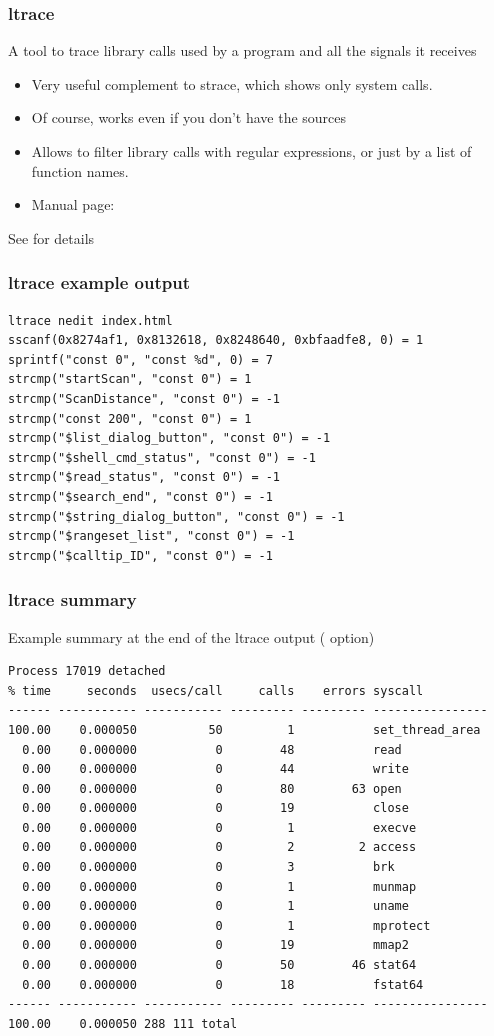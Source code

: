 \begin{frame}
  \frametitle{ltrace}
  A tool to trace library calls used by a program and all the signals
  it receives
  \begin{itemize}
  \item Very useful complement to strace, which shows only system
    calls.
  \item Of course, works even if you don't have the sources
  \item Allows to filter library calls with regular expressions, or
    just by a list of function names.
  \item Manual page: 
  \end{itemize}
  See  for details
\end{frame}

\begin{frame}[fragile]
  \frametitle{ltrace example output}
  \small
  \begin{block}{}
\begin{verbatim}
ltrace nedit index.html
sscanf(0x8274af1, 0x8132618, 0x8248640, 0xbfaadfe8, 0) = 1
sprintf("const 0", "const %d", 0) = 7
strcmp("startScan", "const 0") = 1
strcmp("ScanDistance", "const 0") = -1
strcmp("const 200", "const 0") = 1
strcmp("$list_dialog_button", "const 0") = -1
strcmp("$shell_cmd_status", "const 0") = -1
strcmp("$read_status", "const 0") = -1
strcmp("$search_end", "const 0") = -1
strcmp("$string_dialog_button", "const 0") = -1
strcmp("$rangeset_list", "const 0") = -1
strcmp("$calltip_ID", "const 0") = -1
\end{verbatim}
\end{block}
\end{frame}

\begin{frame}[fragile]
  \frametitle{ltrace summary}
  Example summary at the end of the ltrace output ( option)
  \scriptsize
  \begin{block}{}
\begin{verbatim}
Process 17019 detached
% time     seconds  usecs/call     calls    errors syscall
------ ----------- ----------- --------- --------- ----------------
100.00    0.000050          50         1           set_thread_area
  0.00    0.000000           0        48           read
  0.00    0.000000           0        44           write
  0.00    0.000000           0        80        63 open
  0.00    0.000000           0        19           close
  0.00    0.000000           0         1           execve
  0.00    0.000000           0         2         2 access
  0.00    0.000000           0         3           brk
  0.00    0.000000           0         1           munmap
  0.00    0.000000           0         1           uname
  0.00    0.000000           0         1           mprotect
  0.00    0.000000           0        19           mmap2
  0.00    0.000000           0        50        46 stat64
  0.00    0.000000           0        18           fstat64
------ ----------- ----------- --------- --------- ----------------
100.00    0.000050 288 111 total
\end{verbatim}
  \end{block}
\end{frame}

